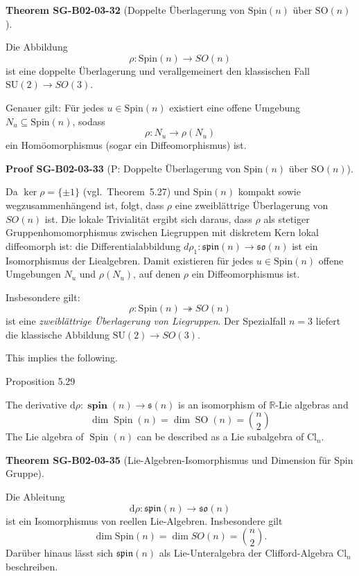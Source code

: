 \documentclass[10pt, letterpaper]{article}
\newcommand{\Cl}{\mathrm{Cl}}
\newcommand{\SO}{\mathrm{SO}}
\newcommand{\SU}{\mathrm{SU}}
\newcommand{\Spin}{\mathrm{Spin}}
\newcommand{\CustomHeading}[3]{%
  \par\medskip\noindent%
  \textbf{#1 #2} \textnormal{(#3)}.\enskip%
}
\newenvironment{THEO}[2]{\begin{unitbox}\CustomHeading{Theorem}{#1}{#2}}{\end{unitbox}}
\newenvironment{PROOF}[2]{\begin{unitbox}\CustomHeading{Proof}{#1}{#2}}{\end{unitbox}}
\begin{document}
\begin{THEO}{SG-B02-03-32}{Doppelte Überlagerung von \(\Spin(n)\) über \(\SO(n)\)}
Die Abbildung
\[
\rho:\Spin(n)\longrightarrow SO(n)
\]
ist eine doppelte Überlagerung und verallgemeinert den klassischen Fall
\(\SU(2)\longrightarrow SO(3)\).

Genauer gilt: Für jedes \(u\in\Spin(n)\) existiert eine offene Umgebung 
\(N_u\subseteq\Spin(n)\), sodass
\[
\rho:N_u\longrightarrow \rho(N_u)
\]
ein Homöomorphismus (sogar ein Diffeomorphismus) ist.
\end{THEO}



\begin{PROOF}{SG-B02-03-33}{P: Doppelte Überlagerung von \(\Spin(n)\) über \(\SO(n)\)}
Da \(\ker\rho=\{\pm1\}\) (vgl.\ Theorem~5.27) und \(\Spin(n)\) kompakt sowie
wegzusammenhängend ist, folgt, dass \(\rho\) eine zweiblättrige Überlagerung 
von \(SO(n)\) ist. Die lokale Trivialität ergibt sich daraus, dass 
\(\rho\) als stetiger Gruppenhomomorphismus zwischen Liegruppen 
mit diskretem Kern lokal diffeomorph ist:  
die Differentialabbildung \(d\rho_1:\mathfrak{spin}(n)\to\mathfrak{so}(n)\)
ist ein Isomorphismus der Liealgebren.
Damit existieren für jedes \(u\in\Spin(n)\) offene Umgebungen \(N_u\)
und \(\rho(N_u)\), auf denen \(\rho\) ein Diffeomorphismus ist.

Insbesondere gilt:
\[
\rho:\Spin(n)\twoheadrightarrow SO(n)
\]
ist eine \emph{zweiblättrige Überlagerung von Liegruppen}.
Der Spezialfall \(n=3\) liefert die klassische Abbildung 
\(\SU(2)\to SO(3)\).
\end{PROOF}



This implies the following.



Proposition 5.29

The derivative $\mathrm{d} \rho: \boldsymbol{\operatorname { s p i n }}(n) \longrightarrow \boldsymbol{\mathfrak { s }}(n)$ is an isomorphism of $\mathbb{R}$-Lie algebras and
$$
\operatorname{dim} \operatorname{Spin}(n)=\operatorname{dim} \operatorname{SO}(n)=\binom{n}{2}
$$
The Lie algebra of $\operatorname{Spin}(n)$ can be described as a Lie subalgebra of $\mathrm{Cl}_{n}$.




\begin{THEO}{SG-B02-03-35}{Lie-Algebren-Isomorphismus und Dimension für Spin Gruppe}
Die Ableitung
\[
\mathrm{d}\rho:\mathfrak{spin}(n)\longrightarrow\mathfrak{so}(n)
\]
ist ein Isomorphismus von reellen Lie-Algebren. Insbesondere gilt
\[
\dim\Spin(n)=\dim SO(n)=\binom{n}{2}.
\]
Darüber hinaus lässt sich \(\mathfrak{spin}(n)\) als Lie-Unteralgebra der Clifford-Algebra
\(\Cl_n\) beschreiben.
\end{THEO}
\end{document}
